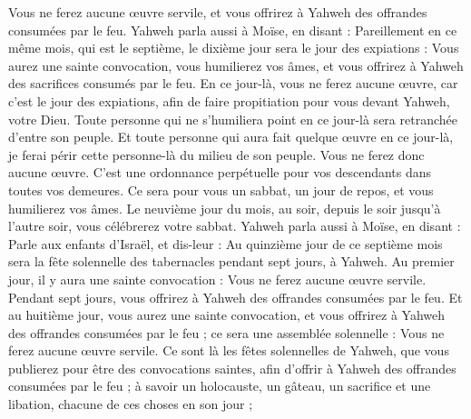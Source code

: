 \begin{multicols}{2}
Vous ne ferez aucune œuvre servile, et vous offrirez à Yahweh des offrandes consumées par le feu.
Yahweh parla aussi à Moïse, en disant :
Pareillement en ce même mois, qui est le septième, le dixième jour sera le jour des expiations : Vous aurez une sainte convocation, vous humilierez vos âmes, et vous offrirez à Yahweh des sacrifices consumés par le feu.
En ce jour-là, vous ne ferez aucune œuvre, car c'est le jour des expiations, afin de faire propitiation pour vous devant Yahweh, votre Dieu.
Toute personne qui ne s'humiliera point en ce jour-là sera retranchée d'entre son peuple.
Et toute personne qui aura fait quelque œuvre en ce jour-là, je ferai périr cette personne-là du milieu de son peuple.
Vous ne ferez donc aucune œuvre. C'est une ordonnance perpétuelle pour vos descendants dans toutes vos demeures.
Ce sera pour vous un sabbat, un jour de repos, et vous humilierez vos âmes. Le neuvième jour du mois, au soir, depuis le soir jusqu'à l'autre soir, vous célébrerez votre sabbat.
Yahweh parla aussi à Moïse, en disant :
Parle aux enfants d'Israël, et dis-leur : Au quinzième jour de ce septième mois sera la fête solennelle des tabernacles pendant sept jours, à Yahweh.
Au premier jour, il y aura une sainte convocation : Vous ne ferez aucune œuvre servile.
Pendant sept jours, vous offrirez à Yahweh des offrandes consumées par le feu. Et au huitième jour, vous aurez une sainte convocation, et vous offrirez à Yahweh des offrandes consumées par le feu ; ce sera une assemblée solennelle : Vous ne ferez aucune œuvre servile.
Ce sont là les fêtes solennelles de Yahweh, que vous publierez pour être des convocations saintes, afin d'offrir à Yahweh des offrandes consumées par le feu ; à savoir un holocauste, un gâteau, un sacrifice et une libation, chacune de ces choses en son jour ;

\end{multicols}

